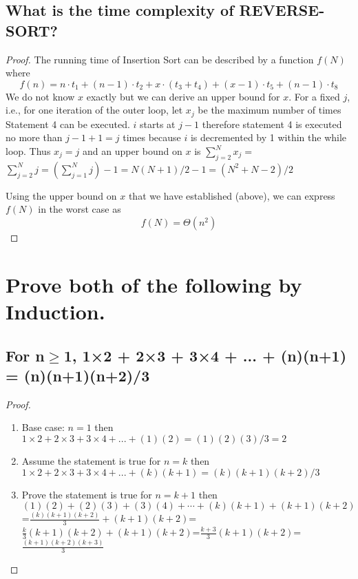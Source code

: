 \documentclass[a4paper]{article}
\begin{document}
\subsection{What is the time complexity of REVERSE-SORT?}
\begin{proof}
The running time of Insertion Sort can be described by a function $f(N)$ where
$$
f(n)=n \cdot t_1+(n-1) \cdot t_2+x \cdot (t_3+t_4)+(x-1) \cdot t_5+(n-1)\cdot t_8
$$
We do not know $x$ exactly but we can derive an upper bound for $x$. For a fixed $j$, i.e., for one iteration of the outer loop, let $x_j$ be the maximum number of times Statement 4 can be executed. $i$ starts at $j-1$ therefore statement 4 is executed no more than $j-1+1=j$ times because $i$ is decremented by 1 within the while loop. Thus $x_j=j$ and an upper bound on $x$ is $\sum_{j=2}^N x_j=$ $\sum_{j=2}^N j=\left(\sum_{j=1}^N j\right)-1=N(N+1) / 2-1=\left(N^2+N-2\right) / 2$

Using the upper bound on $x$ that we have established (above), we can express $f(N)$ in the worst case as
$$
f(N)=\Theta (n^2)
$$
     
\end{proof}
\section{Prove both of the following by Induction. }
\subsection{ For n$\geq$1, 1×2 + 2×3 + 3×4 + ... + (n)(n+1)  =  (n)(n+1)(n+2)/3}
\begin{proof}
    \begin{enumerate}
        \item Base case: $n=1$ then $1×2 + 2×3 + 3×4 + ... + (1)(2)  =  (1)(2)(3)/3=2$
        \item Assume the statement is true for $n=k$ then $1×2 + 2×3 + 3×4 + ... + (k)(k+1)  =  (k)(k+1)(k+2)/3$
        \item Prove the statement is true for $n=k+1$ then $(1)(2)+(2)(3)+(3)(4)+\cdots+(k)(k+1)+(k+1)(k+2)$=$\frac{(k)(k+1)(k+2)}{3}+(k+1)(k+2)$=$\frac{k}{3}(k+1)(k+2)+(k+1)(k+2)$=$\frac{k+3}{3}(k+1)(k+2)$=$\frac{(k+1)(k+2)(k+3)}{3}$
    \end{enumerate}

\end{proof}
\end{document}

